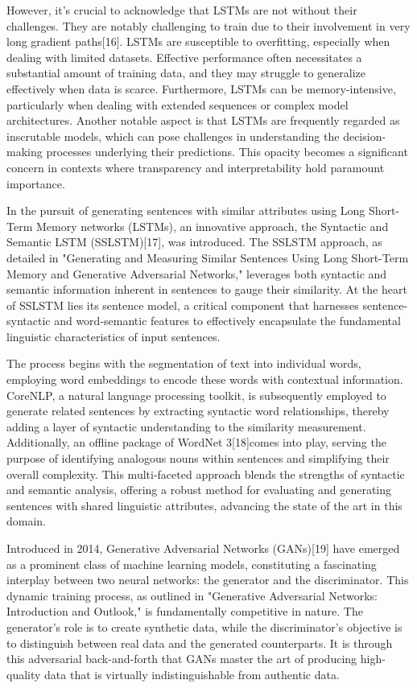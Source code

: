 \documentclass[conference]{IEEEtran}
\begin{document}
However, it's crucial to acknowledge that LSTMs are not without their challenges. They are notably challenging to train due to their involvement in very long gradient paths[16]. LSTMs are susceptible to overfitting, especially when dealing with limited datasets. Effective performance often necessitates a substantial amount of training data, and they may struggle to generalize effectively when data is scarce. Furthermore, LSTMs can be memory-intensive, particularly when dealing with extended sequences or complex model architectures. Another notable aspect is that LSTMs are frequently regarded as inscrutable models, which can pose challenges in understanding the decision-making processes underlying their predictions. This opacity becomes a significant concern in contexts where transparency and interpretability hold paramount importance.



In the pursuit of generating sentences with similar attributes using Long Short-Term Memory networks (LSTMs), an innovative approach, the Syntactic and Semantic LSTM (SSLSTM)[17], was introduced. The SSLSTM approach, as detailed in "Generating and Measuring Similar Sentences Using Long Short-Term Memory and Generative Adversarial Networks," leverages both syntactic and semantic information inherent in sentences to gauge their similarity. At the heart of SSLSTM lies its sentence model, a critical component that harnesses sentence-syntactic and word-semantic features to effectively encapsulate the fundamental linguistic characteristics of input sentences.


The process begins with the segmentation of text into individual words, employing word embeddings to encode these words with contextual information. CoreNLP, a natural language processing toolkit, is subsequently employed to generate related sentences by extracting syntactic word relationships, thereby adding a layer of syntactic understanding to the similarity measurement. Additionally, an offline package of WordNet 3[18]comes into play, serving the purpose of identifying analogous nouns within sentences and simplifying their overall complexity. This multi-faceted approach blends the strengths of syntactic and semantic analysis, offering a robust method for evaluating and generating sentences with shared linguistic attributes, advancing the state of the art in this domain.



Introduced in 2014, Generative Adversarial Networks (GANs)[19] have emerged as a prominent class of machine learning models, constituting a fascinating interplay between two neural networks: the generator and the discriminator. This dynamic training process, as outlined in "Generative Adversarial Networks: Introduction and Outlook," is fundamentally competitive in nature. The generator's role is to create synthetic data, while the discriminator's objective is to distinguish between real data and the generated counterparts. It is through this adversarial back-and-forth that GANs master the art of producing high-quality data that is virtually indistinguishable from authentic data.
\end{document}
